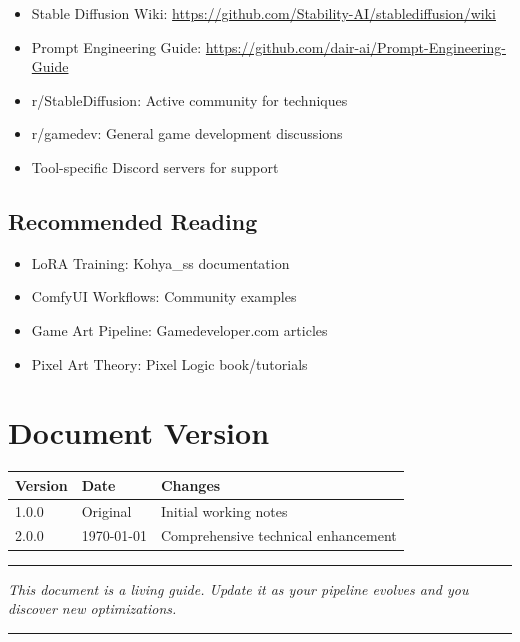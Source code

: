 \documentclass[11pt]{article}
\begin{document}
\begin{itemize}
    \item Stable Diffusion Wiki: \url{https://github.com/Stability-AI/stablediffusion/wiki}
    \item Prompt Engineering Guide: \url{https://github.com/dair-ai/Prompt-Engineering-Guide}
    \item r/StableDiffusion: Active community for techniques
    \item r/gamedev: General game development discussions
    \item Tool-specific Discord servers for support
\end{itemize}

\subsection{Recommended Reading}

\begin{itemize}
    \item LoRA Training: Kohya\_ss documentation
    \item ComfyUI Workflows: Community examples
    \item Game Art Pipeline: Gamedeveloper.com articles
    \item Pixel Art Theory: Pixel Logic book/tutorials
\end{itemize}

\section{Document Version}

\begin{table}[H]
\centering
\begin{tabular}{lll}
\toprule
\textbf{Version} & \textbf{Date} & \textbf{Changes} \\
\midrule
1.0.0 & Original & Initial working notes \\
2.0.0 & \today & Comprehensive technical enhancement \\
\bottomrule
\end{tabular}
\end{table}

\vfill

\begin{center}
\rule{0.5\textwidth}{0.4pt}

\textit{This document is a living guide. Update it as your pipeline evolves and you discover new optimizations.}

\rule{0.5\textwidth}{0.4pt}
\end{center}
\end{document}

